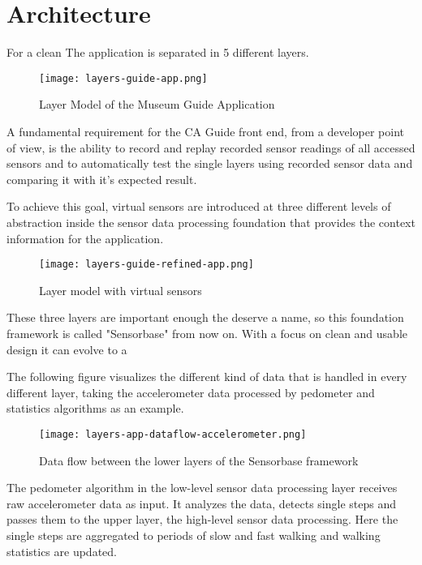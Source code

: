 \section{Architecture}

For a clean The application is separated in 5 different layers.

\begin{figure}[H]
\centering
\texttt{[image: layers-guide-app.png]}
\caption{Layer Model of the Museum Guide Application}
\end{figure}

A fundamental requirement for the CA Guide front end, from a developer point of view, is the ability to record and replay recorded sensor readings of all accessed sensors and to automatically test the single layers using recorded sensor data and comparing it with it's expected result.

To achieve this goal, virtual sensors are introduced at three different levels of abstraction inside the sensor data processing foundation that provides the context information for the application.
 
\begin{figure}[H]
\centering
\texttt{[image: layers-guide-refined-app.png]}
\caption{Layer model with virtual sensors}
\end{figure}

These three layers are important enough the deserve a name, so this foundation framework is called "Sensorbase" from now on. With a focus on clean and usable design it can evolve to a 

The following figure visualizes the different kind of data that is handled in every different layer, taking the accelerometer data processed by pedometer and statistics algorithms as an example. 

\begin{figure}[H]
\centering
\texttt{[image: layers-app-dataflow-accelerometer.png]}
\caption{Data flow between the lower layers of the Sensorbase framework}
\end{figure}

The pedometer algorithm in the low-level sensor data processing layer receives raw accelerometer data as input. It analyzes the data, detects single steps and passes them to the upper layer, the high-level sensor data processing. Here the single steps are aggregated to periods of slow and fast walking and walking statistics are updated.

